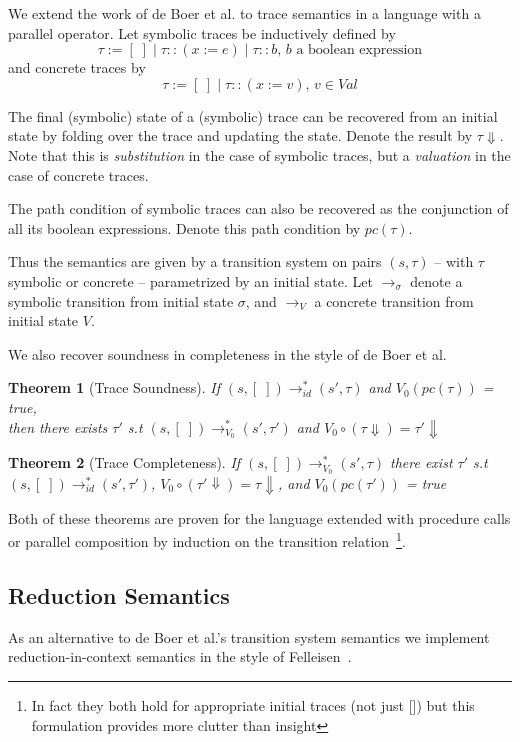 \documentclass[submission,copyright,creativecommons]{eptcs}
\newtheorem{theorem}{Theorem}
\begin{document}
We extend the work of de Boer et al. to trace semantics in a language with a parallel operator.
Let symbolic traces be inductively defined by
\[\tau := [\;] \mid \tau :: (x := e) \mid \tau :: b \mbox{, $b$ a boolean expression} \]
and concrete traces by
\[\tau := [\;] \mid \tau :: (x := v) \mbox{, $v \in Val$} \]

The final (symbolic) state of a (symbolic) trace can be recovered from an initial state by folding over
the trace and updating the state. Denote the result by $\tau\Downarrow$. Note that this is \emph{substitution}
in the case of symbolic traces, but a \emph{valuation} in the case of concrete traces.

The path condition of symbolic traces can also be recovered as the conjunction of all its boolean expressions.
Denote this path condition by $pc(\tau)$.

Thus the semantics are given by a transition system on pairs $(s, \tau)$ -- with $\tau$ symbolic or concrete --
parametrized by an initial state. Let $\rightarrow_{\sigma}$ denote a symbolic transition from initial state $\sigma$,
and $\rightarrow_{V}$ a concrete transition from initial state $V$.

We also recover soundness in completeness in the style of de Boer et al.
\begin{theorem}[Trace Soundness]
  If $(s, [\;]) \rightarrow_{id}^{*} (s', \tau)$ and $V_{0}(pc(\tau))$ = true,\\
  then there exists $\tau'$ s.t $(s, [\;]) \rightarrow_{V_0}^{*} (s', \tau')$ and
    $V_{0} \circ (\tau\Downarrow) = \tau'\Downarrow$
\end{theorem}

\begin{theorem}[Trace Completeness]
  If $(s, [\;]) \rightarrow_{V_{0}}^{*} (s', \tau)$ there exist $\tau'$ s.t \\
  $(s, [\;]) \rightarrow_{id}^{*} (s', \tau')$, $V_{0} \circ (\tau' \Downarrow) = \tau\Downarrow$,
  and $V_{0}(pc(\tau'))$ = true
\end{theorem}

Both of these theorems are proven for the language extended with procedure calls or parallel composition
by induction on the transition relation~\footnote{In fact they both hold for appropriate initial traces (not just [])
but this formulation provides more clutter than insight}.

\subsection*{Reduction Semantics}
As an alternative to de Boer et al.'s transition system semantics we implement reduction-in-context semantics in the
style of Felleisen~\cite{FELLEISEN1992235}.
\end{document}
